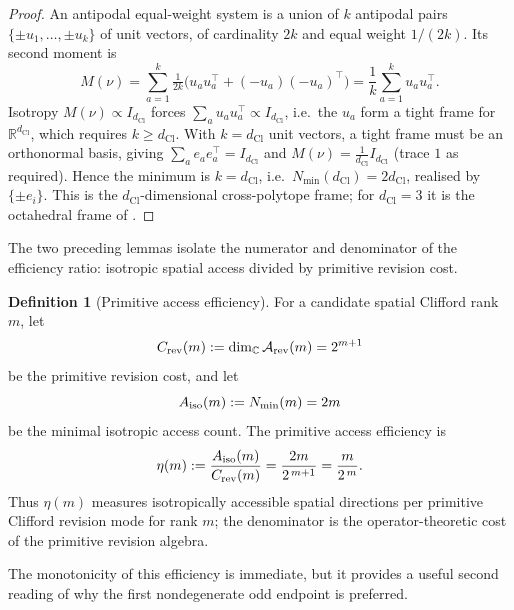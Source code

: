 \documentclass[11pt]{article}
\theoremstyle{definition}
\newtheorem{definition}[theorem]{Definition}
\theoremstyle{remark}
\newcommand{\R}{\mathbb{R}}
\newcommand{\C}{\mathbb{C}}
\newcommand{\Arev}{\mathcal{A}_{\mathrm{rev}}}
\newcommand{\dCl}{d_{\mathrm{Cl}}}
\begin{document}
\begin{proof}
An antipodal equal-weight system is a union of \(k\) antipodal pairs
\(\{\pm u_1,\dots,\pm u_k\}\) of unit vectors, of cardinality \(2k\) and equal
weight \(1/(2k)\).  Its second moment is
\[
  M(\nu)=\sum_{a=1}^{k}\tfrac1{2k}\bigl(u_au_a^{\top}+(-u_a)(-u_a)^{\top}\bigr)
        =\frac1k\sum_{a=1}^{k}u_au_a^{\top}.
\]
Isotropy \(M(\nu)\propto I_{\dCl}\) forces \(\sum_a u_au_a^{\top}\propto I_{\dCl}\), i.e.\
the \(u_a\) form a tight frame for \(\R^{\dCl}\), which requires \(k\ge \dCl\).  With
\(k=\dCl\) unit vectors, a tight frame must be an orthonormal basis, giving
\(\sum_a e_ae_a^{\top}=I_{\dCl}\) and \(M(\nu)=\tfrac1{\dCl} I_{\dCl}\) (trace \(1\) as
required).  Hence the minimum is \(k=\dCl\), i.e.\ \(N_{\min}(\dCl)=2\dCl\), realised by
\(\{\pm e_i\}\).  This is the \(\dCl\)-dimensional cross-polytope frame; for \(\dCl=3\)
it is the octahedral frame of \Cref{ex:3plus1}.
\end{proof}

The two preceding lemmas isolate the numerator and denominator of the
efficiency ratio: isotropic spatial access divided by primitive revision cost.

\begin{definition}[Primitive access efficiency]
\label{def:access-efficiency}
For a candidate spatial Clifford rank \(m\), let
\[
  C_{\rm rev}(m):=\dim_\C\Arev(m)=2^{m+1}
\]
be the primitive revision cost, and let
\[
  A_{\rm iso}(m):=N_{\min}(m)=2m
\]
be the minimal isotropic access count.  The primitive access efficiency is
\[
  \eta(m):=\frac{A_{\rm iso}(m)}{C_{\rm rev}(m)}
          =\frac{2m}{2^{\,m+1}}
          =\frac{m}{2^{\,m}} .
\]
Thus \(\eta(m)\) measures isotropically accessible spatial directions per
primitive Clifford revision mode for rank \(m\); the denominator is the
operator-theoretic cost of the primitive revision algebra.
\end{definition}

The monotonicity of this efficiency is immediate, but it provides a useful
second reading of why the first nondegenerate odd endpoint is preferred.
\end{document}

